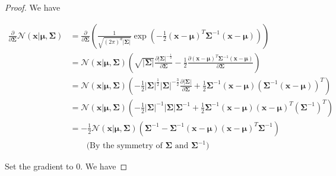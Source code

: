 \documentclass{article}
\begin{document}
\vspace{1em}
\begin{proof}
    We have
    
    \vspace{-3em}
    \begin{align*}
        \frac{\partial}{\partial\boldsymbol{\Sigma}}\mathcal{N}(\mathbf{x}|\boldsymbol{\mu},\boldsymbol{\Sigma}) &= \frac{\partial}{\partial\boldsymbol{\Sigma}}\left(\frac{1}{\sqrt{(2\pi)^d|\boldsymbol{\Sigma}|}}\exp\left(-\frac{1}{2}(\mathbf{x}-\boldsymbol{\mu})^T\boldsymbol{\Sigma}^{-1}(\mathbf{x}-\boldsymbol{\mu})\right)\right) \\
        &= \mathcal{N}(\mathbf{x}|\boldsymbol{\mu},\boldsymbol{\Sigma})\left(\sqrt{|\boldsymbol{\Sigma}|}\frac{\partial|\boldsymbol{\Sigma}|^{-\frac{1}{2}}}{\partial\boldsymbol{\Sigma}}-\frac{1}{2}\frac{\partial(\mathbf{x}-\boldsymbol{\mu})^T\boldsymbol{\Sigma}^{-1}(\mathbf{x}-\boldsymbol{\mu})}{\partial\boldsymbol{\Sigma}}\right)\\
        &= \mathcal{N}(\mathbf{x}|\boldsymbol{\mu},\boldsymbol{\Sigma})\left(-\frac{1}{2}|\boldsymbol{\Sigma}|^{\frac{1}{2}}|\boldsymbol{\Sigma}|^{-\frac{3}{2}}\frac{\partial|\boldsymbol{\Sigma}|}{\partial\boldsymbol{\Sigma}}
        +\frac{1}{2}\boldsymbol{\Sigma}^{-1}(\mathbf{x}-\boldsymbol{\mu})\left(\boldsymbol{\Sigma}^{-1}(\mathbf{x}-\boldsymbol{\mu})\right)^T\right)\quad\ \ \\
        &= \mathcal{N}(\mathbf{x}|\boldsymbol{\mu},\boldsymbol{\Sigma})\left(-\frac{1}{2}|\boldsymbol{\Sigma}|^{-1}|\boldsymbol{\Sigma}|\boldsymbol{\Sigma}^{-1}
        +\frac{1}{2}\boldsymbol{\Sigma}^{-1}(\mathbf{x}-\boldsymbol{\mu})(\mathbf{x}-\boldsymbol{\mu})^T\left(\boldsymbol{\Sigma}^{-1}\right)^T\right) \\
        &= -\frac{1}{2}\mathcal{N}(\mathbf{x}|\boldsymbol{\mu},\boldsymbol{\Sigma})\left(\boldsymbol{\Sigma}^{-1}
        -\boldsymbol{\Sigma}^{-1}(\mathbf{x}-\boldsymbol{\mu})(\mathbf{x}-\boldsymbol{\mu})^T\boldsymbol{\Sigma}^{-1}\right) \\
        &\qquad\text{(By the symmetry of $\boldsymbol{\Sigma}$ and $\boldsymbol{\Sigma}^{-1}$)}
    \end{align*}
    
    \vspace{-1em}\hspace{1.3em}
    Set the gradient to 0. We have
    

\end{proof}
\end{document}
